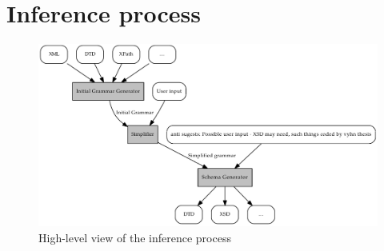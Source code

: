 \documentclass[a4paper,10pt,oneside]{article}
\newcommand{\myscale}{0.74}
\begin{document}
\section{Inference process}
\begin{figure}
	\centering\includegraphics[scale=\myscale]{inference_process}
	\caption{High-level view of the inference process} \label{inference_process}
\end{figure}
\end{document}
